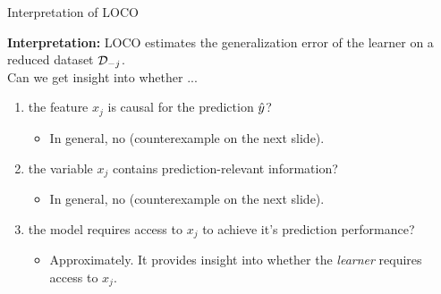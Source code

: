 \documentclass[11pt,compress,t,notes=noshow, aspectratio=169, xcolor=table]{beamer}
\begin{document}
\begin{vbframe}{Interpretation of LOCO}

\textbf{Interpretation:} LOCO estimates the generalization error of the learner on a reduced dataset $\D_{-j}$.\\
\lz
Can we get insight into whether ...
\begin{enumerate}
    \item the feature $x_j$ is causal for the prediction $\yh$?
    \begin{itemize}
      \item In general, no (counterexample on the next slide).
    \end{itemize}
    \item the variable $x_j$ contains prediction-relevant information?
    \begin{itemize}
      \item In general, no (counterexample on the next slide).
    \end{itemize}
    \item the model requires access to $x_j$ to achieve it's prediction performance?
    \begin{itemize}
      \item Approximately. It provides insight into whether the \textit{learner} requires access to $x_j$.
    \end{itemize}
\end{enumerate}
\end{vbframe}
\end{document}
